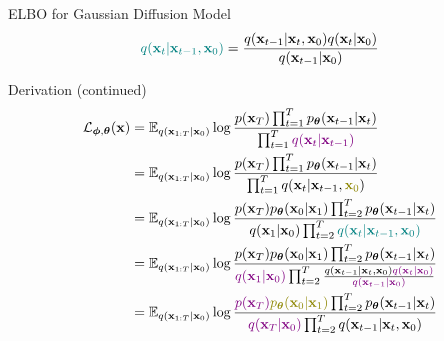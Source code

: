 \documentclass{beamer}
\renewcommand{\eqpause}{}
\renewcommand{\nextonslide}[1]{#1}
\begin{document}
\begin{frame}{ELBO for Gaussian Diffusion Model}
    \[
         {\color{teal}q(\mathbf{x}_t | \mathbf{x}_{t-1}, \mathbf{x}_0)}  = \frac{q(\mathbf{x}_{t-1}|\mathbf{x}_t, \mathbf{x}_0)q(\mathbf{x}_{t} | \mathbf{x}_0)}{q(\mathbf{x}_{t-1}| \mathbf{x}_0)}
    \]
    \eqpause
    \vspace{-0.3cm}
    \begin{block}{Derivation (continued)}
        \vspace{-0.6cm}
        {\small
        \begin{align*}
            \cL_{\bphi, \btheta}(\bx) & = \bbE_{q(\bx_{1:T} | \bx_0)} \log \frac{p(\bx_T) \prod_{t=1}^T \pt(\bx_{t-1} | \bx_t) }{\prod_{t=1}^T {\color{violet}q(\bx_t | \bx_{t-1})}}  \\ 
            \nextonslide{& = \bbE_{q(\bx_{1:T} | \bx_0)} \log \frac{p(\bx_T) \prod_{t=1}^T \pt(\bx_{t-1} | \bx_t) }{\prod_{t=1}^T q(\bx_t | \bx_{t-1}, {\color{olive}\bx_0})}  }\\ 
            \nextonslide{& = \bbE_{q(\bx_{1:T} | \bx_0)} \log \frac{p(\bx_T) \pt(\bx_0 | \bx_1) \prod_{t=2}^T \pt(\bx_{t-1} | \bx_t) }{q(\bx_1 | \bx_0)\prod_{t=2}^T {\color{teal}q(\bx_t | \bx_{t-1}, \bx_0)}} }\\
            \nextonslide{& = \bbE_{q(\bx_{1:T} | \bx_0)} \log \frac{p(\bx_T) \pt(\bx_0 | \bx_1) \prod_{t=2}^T \pt(\bx_{t-1} | \bx_t) }{{\color{violet}q(\bx_1 | \bx_0)}\prod_{t=2}^T \frac{q(\bx_{t-1}|\bx_t, \bx_0) {\color{violet}q(\bx_{t} | \bx_0)}}{{\color{violet}q(\bx_{t-1}| \bx_0)}}} }\\
            \nextonslide{& = \bbE_{q(\bx_{1:T} | \bx_0)} \log \frac{{\color{violet}p(\bx_T)} {\color{olive}\pt(\bx_0 | \bx_1)} \prod_{t=2}^T \pt(\bx_{t-1} | \bx_t) }{{\color{violet}q(\bx_T | \bx_0)}\prod_{t=2}^T q(\bx_{t-1}|\bx_t, \bx_0)} }
        \end{align*}}
    \end{block}
\end{frame}
\end{document}
